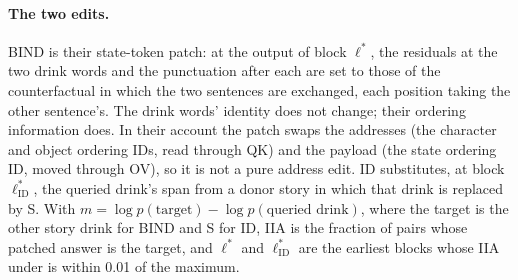 \paragraph{The two edits.} BIND is their state-token patch: at the output of block $\ell^*$, the residuals at the two drink words and the punctuation after each are set to those of the counterfactual in which the two sentences are exchanged, each position taking the other sentence's. The drink words' identity does not change; their ordering information does. In their account the patch swaps the addresses (the character and object ordering IDs, read through QK) and the payload (the state ordering ID, moved through OV), so it is not a pure address edit. ID substitutes, at block $\ell^*_{\mathrm{ID}}$, the queried drink's span from a donor story in which that drink is replaced by S. With $m = \log p(\text{target}) - \log p(\text{queried drink})$, where the target is the other story drink for BIND and S for ID, IIA is the fraction of pairs whose patched answer is the target, and $\ell^*$ and $\ell^*_{\mathrm{ID}}$ are the earliest blocks whose IIA under \fmtNone{} is within 0.01 of the maximum.

\begin{table}[!ht]
\centering
\small
\caption{\textbf{Replication of the binding swap} (Qwen2.5-14B-Instruct, \fmtNone{}, IIA of BIND by patched block). Released: the per-layer values published with \citet{prakash2025lookbacks} on their 80 validation pairs, transcribed from their release (not part of our results). Ours: \PkN{} pairs, and the \PkSharedN{} pairs shared with their validation split. Recomputed from our sweep files; a reproduction check, since the released values were seen before preregistration H was finalised.}
\label{tab:replication}

\end{table}

